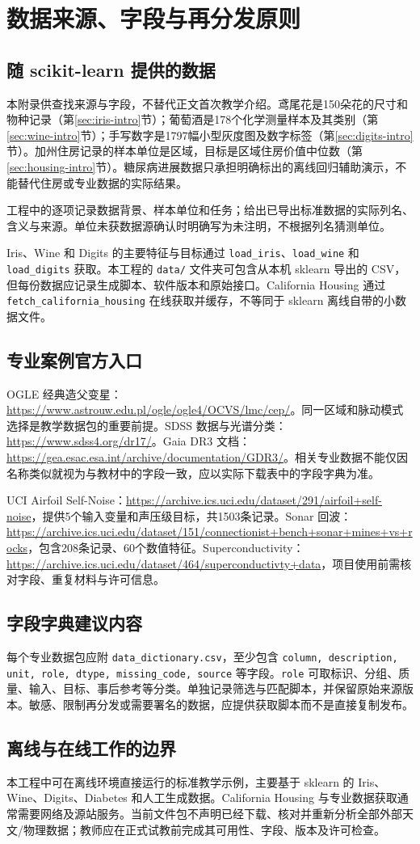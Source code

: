 \chapter{数据来源、字段与再分发原则}
\section{随 scikit-learn 提供的数据}
本附录供查找来源与字段，不替代正文首次教学介绍。鸢尾花是150朵花的尺寸和物种记录（第\ref{sec:iris-intro}节）；葡萄酒是178个化学测量样本及其类别（第\ref{sec:wine-intro}节）；手写数字是1797幅小型灰度图及数字标签（第\ref{sec:digits-intro}节）。加州住房记录的样本单位是区域，目标是区域住房价值中位数（第\ref{sec:housing-intro}节）。糖尿病进展数据只承担明确标出的离线回归辅助演示，不能替代住房或专业数据的实际结果。

工程中的逐项记录数据背景、样本单位和任务；给出已导出标准数据的实际列名、含义与来源。单位未获数据源确认时明确写为未注明，不根据列名猜测单位。

Iris、Wine 和 Digits 的主要特征与目标通过 \texttt{load\_iris}、\texttt{load\_wine} 和 \texttt{load\_digits} 获取。本工程的 \texttt{data/} 文件夹可包含从本机 sklearn 导出的 CSV，但每份数据应记录生成脚本、软件版本和原始接口。California Housing 通过 \texttt{fetch\_california\_housing} 在线获取并缓存，不等同于 sklearn 离线自带的小数据文件。
\section{专业案例官方入口}
OGLE 经典造父变星：\url{https://www.astrouw.edu.pl/ogle/ogle4/OCVS/lmc/cep/}。同一区域和脉动模式选择是教学数据包的重要前提。SDSS 数据与光谱分类：\url{https://www.sdss4.org/dr17/}。Gaia DR3 文档：\url{https://gea.esac.esa.int/archive/documentation/GDR3/}。相关专业数据不能仅因名称类似就视为与教材中的字段一致，应以实际下载表中的字段字典为准。

UCI Airfoil Self-Noise：\url{https://archive.ics.uci.edu/dataset/291/airfoil+self-noise}，提供5个输入变量和声压级目标，共1503条记录。Sonar 回波：\url{https://archive.ics.uci.edu/dataset/151/connectionist+bench+sonar+mines+vs+rocks}，包含208条记录、60个数值特征。Superconductivity：\url{https://archive.ics.uci.edu/dataset/464/superconductivty+data}，项目使用前需核对字段、重复材料与许可信息。
\section{字段字典建议内容}
每个专业数据包应附 \texttt{data\_dictionary.csv}，至少包含 \texttt{column, description, unit, role, dtype, missing\_code, source} 等字段。\texttt{role} 可取标识、分组、质量、输入、目标、事后参考等分类。单独记录筛选与匹配脚本，并保留原始来源版本。敏感、限制再分发或需要署名的数据，应提供获取脚本而不是直接复制发布。
\section{离线与在线工作的边界}
本工程中可在离线环境直接运行的标准教学示例，主要基于 sklearn 的 Iris、Wine、Digits、Diabetes 和人工生成数据。California Housing 与专业数据获取通常需要网络及源站服务。当前文件包不声明已经下载、核对并重新分析全部外部天文/物理数据；教师应在正式试教前完成其可用性、字段、版本及许可检查。


